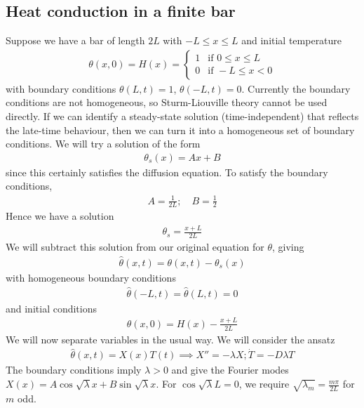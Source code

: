 \subsection{Heat conduction in a finite bar}
Suppose we have a bar of length $2L$ with $-L \leq x \leq L$ and initial temperature
\begin{align*}
	\theta(x,0) = H(x) = \begin{cases}
		1 & \text{if } 0 \leq x \leq L \\
		0 & \text{if } -L \leq x < 0
	\end{cases}
\end{align*}
with boundary conditions $\theta(L, t) = 1$, $\theta(-L, t) = 0$.
Currently the boundary conditions are not homogeneous, so Sturm-Liouville theory cannot be used directly.
If we can identify a steady-state solution (time-independent) that reflects the late-time behaviour, then we can turn it into a homogeneous set of boundary conditions.
We will try a solution of the form
\begin{align*}
	\theta_s(x) = Ax + B
\end{align*}
since this certainly satisfies the diffusion equation.
To satisfy the boundary conditions,
\begin{align*}
	A = \frac{1}{2L};\quad B = \frac{1}{2}
\end{align*}
Hence we have a solution
\begin{align*}
	\theta_s = \frac{x + L}{2L}
\end{align*}
We will subtract this solution from our original equation for $\theta$, giving
\begin{align*}
	\hat \theta(x,t) = \theta(x,t) - \theta_s(x)
\end{align*}
with homogeneous boundary conditions
\begin{align*}
	\hat \theta(-L, t) = \hat \theta(L, t) = 0
\end{align*}
and initial conditions
\begin{align*}
	\theta(x,0) = H(x) - \frac{x+L}{2L}
\end{align*}
We will now separate variables in the usual way.
We will consider the ansatz
\begin{align*}
	\hat \theta(x,t) = X(x) T(t) \implies X'' = - \lambda X; \dot T = -D \lambda T
\end{align*}
The boundary conditions imply $\lambda > 0$ and give the Fourier modes $X(x) = A \cos \sqrt{\lambda} x + B \sin \sqrt{\lambda} x$.
For $\cos \sqrt{\lambda} L = 0$, we require $\sqrt{\lambda_m} = \frac{m \pi}{2L}$ for $m$ odd.
